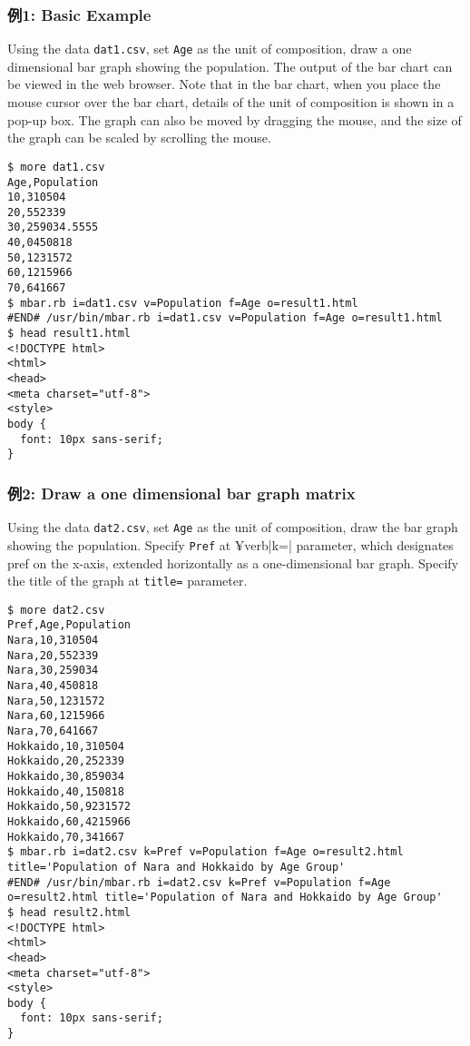 \subsubsection*{例1: Basic Example}

Using the data \verb|dat1.csv|, set \verb|Age| as the unit of composition, draw a one dimensional bar graph showing the population.
The output of the bar chart can be viewed in the web browser. Note that in the bar chart, when you place the mouse cursor over the bar chart, details of the unit of composition is shown in a pop-up box. The graph can also be moved by dragging the mouse, and the size of the graph can be scaled by scrolling the mouse.


\begin{Verbatim}[baselinestretch=0.7,frame=single]
$ more dat1.csv
Age,Population
10,310504
20,552339
30,259034.5555
40,0450818
50,1231572
60,1215966
70,641667
$ mbar.rb i=dat1.csv v=Population f=Age o=result1.html
#END# /usr/bin/mbar.rb i=dat1.csv v=Population f=Age o=result1.html
$ head result1.html
<!DOCTYPE html>
<html>
<head>
<meta charset="utf-8">
<style>
body {
  font: 10px sans-serif;
}
\end{Verbatim}

\begin{flushleft}
\end{flushleft}

\subsubsection*{例2: Draw a one dimensional bar graph matrix}

Using the data \verb|dat2.csv|, set \verb|Age| as the unit of composition, draw the bar graph showing the population. Specify \verb|Pref| at ¥verb|k=| parameter, which designates pref on the x-axis, extended horizontally as a one-dimensional bar graph. Specify the title of the graph at \verb|title=| parameter.


\begin{Verbatim}[baselinestretch=0.7,frame=single]
$ more dat2.csv
Pref,Age,Population
Nara,10,310504
Nara,20,552339
Nara,30,259034
Nara,40,450818
Nara,50,1231572
Nara,60,1215966
Nara,70,641667
Hokkaido,10,310504
Hokkaido,20,252339
Hokkaido,30,859034
Hokkaido,40,150818
Hokkaido,50,9231572
Hokkaido,60,4215966
Hokkaido,70,341667
$ mbar.rb i=dat2.csv k=Pref v=Population f=Age o=result2.html title='Population of Nara and Hokkaido by Age Group'
#END# /usr/bin/mbar.rb i=dat2.csv k=Pref v=Population f=Age o=result2.html title='Population of Nara and Hokkaido by Age Group'
$ head result2.html
<!DOCTYPE html>
<html>
<head>
<meta charset="utf-8">
<style>
body {
  font: 10px sans-serif;
}
\end{Verbatim}

